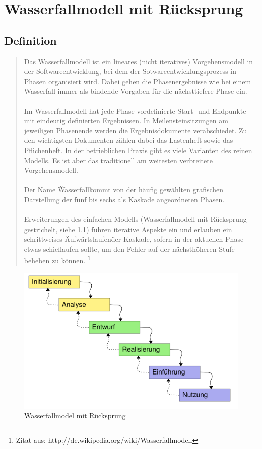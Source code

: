 \chapter{Wasserfallmodell mit Rücksprung}
\section{Definition}
\begin{quote}
Das Wasserfallmodell ist ein lineares (nicht iteratives) Vorgehensmodell in der Softwareentwicklung, bei dem der
 Sotwareentwicklungsprozess in Phasen organisiert wird. Dabei gehen die Phasenergebnisse wie bei einem Wasserfall immer
als bindende Vorgaben für die nächsttiefere Phase ein.\ \\ \\
Im Wasserfallmodell hat jede Phase vordefinierte Start- und Endpunkte mit eindeutig definierten Ergebnissen.
In Meilensteinsitzungen am jeweiligen Phasenende werden die Ergebnisdokumente verabschiedet. Zu den wichtigsten
Dokumenten zählen dabei das Lastenheft sowie das Pflichenheft. In der betrieblichen Praxis gibt es viele Varianten
des reinen Modells. Es ist aber das traditionell am weitesten verbreitete Vorgehensmodell.\ \\ \\
Der Name \"Wasserfall\" kommt von der häufig gewählten grafischen Darstellung der fünf bis sechs als Kaskade
angeordneten Phasen. \\ \\
Erweiterungen des einfachen Modells (Wasserfallmodell mit Rücksprung - gestrichelt, siehe \ref{w_model}) führen iterative Aspekte ein und erlauben
ein schrittweises \"Aufwärtslaufen\" der Kaskade, sofern in der aktuellen Phase etwas schieflaufen sollte,
um den Fehler auf der nächsthöheren Stufe beheben zu können.
\footnote{Zitat aus:  http://de.wikipedia.org/wiki/Wasserfallmodell}
\end{quote}
\begin{figure}[h]
\centering
\includegraphics[width=\textwidth]{./gfx/misc/567px-Wasserfallmodell.png}
\caption{Wasserfallmodel mit Rücksprung}
\label{w_model}
\end{figure}
\newpage


